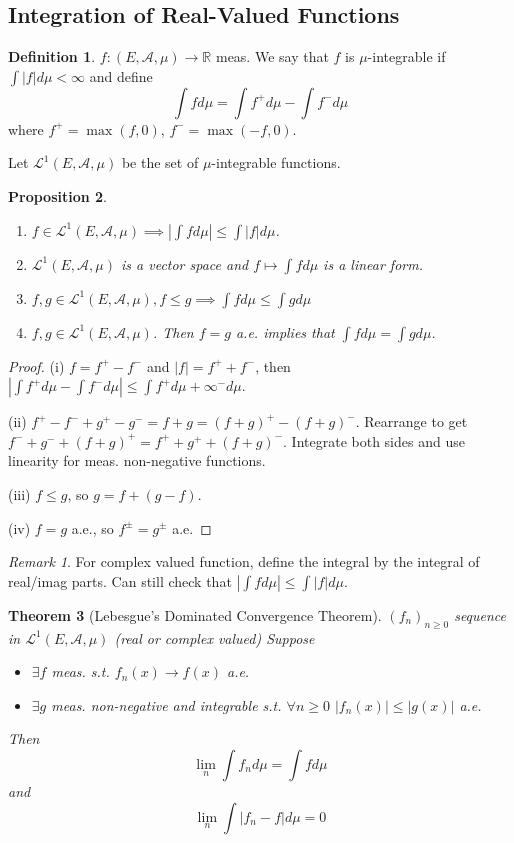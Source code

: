\documentclass{article}
\theoremstyle{definition}
\newtheorem{defn}{Definition}[section]
\theoremstyle{remark}
\newtheorem{rem}{Remark}
\theoremstyle{plain}
\newtheorem{thm}[defn]{Theorem}
\newtheorem{prop}[defn]{Proposition}
\newcommand{\RR}{\mathbb{R}}
\begin{document}
\subsection{Integration of Real-Valued Functions}
\begin{defn}
    $f:(E,\mathcal{A},\mu)\to\RR$ meas. We say that $f$ is $\mu$-integrable if $\int|f|d\mu<\infty$ and define
    \[\int fd\mu=\int f^+d\mu-\int f^-d\mu\]
    where $f^+=\max(f,0)$, $f^-=\max(-f,0)$.
\end{defn}
Let $\mathcal{L}^1(E,\mathcal{A},\mu)$ be the set of $\mu$-integrable functions.
\begin{prop}
    \begin{enumerate}
        \item $f\in\mathcal{L}^1(E,\mathcal{A},\mu)\implies |\int fd\mu|\le \int|f|d\mu$.
        \item $\mathcal{L}^1(E,\mathcal{A},\mu)$ is a vector space and $f\mapsto \int fd\mu$ is a linear form.
        \item $f,g\in \mathcal{L}^1(E,\mathcal{A},\mu),f\le g\implies \int fd\mu\le \int gd\mu$
        \item $f,g\in \mathcal{L}^1(E,\mathcal{A},\mu)$. Then $f=g$ a.e. implies that $\int fd\mu=\int gd\mu$.
    \end{enumerate}
\end{prop}
\begin{proof}
    (i) $f=f^+-f^-$ and $|f|=f^++f^-$, then $|\int f^+d\mu-\int f^-d\mu|\le \int f^+d\mu+\infty^-d\mu$.

    (ii) $f^+-f^-+g^+-g^-=f+g=(f+g)^+-(f+g)^-$. Rearrange to get $f^-+g^-+(f+g)^+=f^++g^++(f+g)^-$. Integrate both sides and use linearity for meas. non-negative functions.

    (iii) $f\le g$, so $g=f+(g-f)$.

    (iv) $f=g$ a.e., so $f^{\pm}=g^\pm$ a.e.
\end{proof}
\begin{rem}
    For complex valued function, define the integral by the integral of real/imag parts. Can still check that $|\int fd\mu|\le\int |f|d\mu$.
\end{rem}
\begin{thm}[Lebesgue's Dominated Convergence Theorem]
    $(f_n)_{n\ge 0}$ sequence in $\mathcal{L}^1(E,\mathcal{A},\mu)$ (real or complex valued) Suppose
    \begin{itemize}
        \item $\exists f$ meas. s.t. $f_n(x)\to f(x)$ a.e.
        \item $\exists g$ meas. non-negative and integrable  s.t. $\forall n\ge 0$ $|f_n(x)|\le |g(x)|$ a.e.
    \end{itemize}
    Then
    \[\lim_n\int f_nd\mu=\int fd\mu\]
    and \[\lim_n\int |f_n-f|d\mu=0\]
\end{thm}
\end{document}
